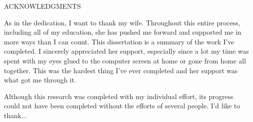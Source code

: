 
\setcounter{page}{3} %

\begin{center}
	ACKNOWLEDGMENTS
\end{center}

\indent As in the dedication, I want to thank my wife. Throughout this entire process, including all of my education, she has pushed me forward and supported me in more ways than I can count. This dissertation is a summary of the work I've completed. I sincerely appreciated her support, especially since a lot my time was spent with my eyes glued to the computer screen at home or gone from home all together. This was the hardest thing I've ever completed and her support was what got me through it.

\indent Although this research was completed with my individual effort, its progress could not have been completed without the efforts of several people. I'd like to thank...

